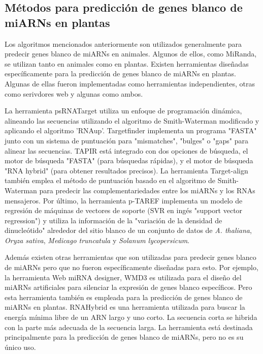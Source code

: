 \subsection{Métodos para predicción de genes blanco de miARNs en plantas}
Los algoritmos mencionados anteriormente son utilizados generalmente para predecir genes blanco de miARNs en animales.
Algunos de ellos, como MiRanda, se utilizan tanto en animales como en plantas.
Existen herramientas diseñadas específicamente para la predicción de genes blanco de miARNs en plantas.
Algunas de ellas fueron implementadas como herramientas independientes, otras como serivdores web y algunas como ambos.

La herramienta psRNATarget \citep{pmid21622958} utiliza un enfoque de programación dinámica, alineando las secuencias utilizando el algoritmo de Smith-Waterman modificado y aplicando el algoritmo 'RNAup'.
Targetfinder \citep{pmid15598838} implementa un programa "FASTA" junto con un sistema de puntuación para "mismatches", "bulges" o "gaps" para alinear las secuencias.
TAPIR \citep{pmid20430753} está integrado con dos opciones de búsqueda, el motor de búsqueda "FASTA" (para búsquedas rápidas), y el motor de búsqueda "RNA hybrid" (para obtener resultados precisos).
La herramienta Target-align \citep{pmid20934992} también emplea el método de puntuación basado en el algoritmo de Smith-Waterman para predecir las complementariedades entre los miARNs y los RNAs mensajeros.
Por último, la herramienta p-TAREF \citep{pmid22206472} implementa un modelo de regresión de máquinas de vectores de soporte (SVR en ingés "support vector regression") y utiliza la información de la "variación de la densidad de dinucleótido" alrededor del sitio blanco de un conjunto de datos de \textit{A. thaliana}, \textit{Oryza sativa}, \textit{Medicago truncatula} y \textit{Solanum lycopersicum}.

Además existen otras herramientas que son utilizadas para predecir genes blanco de miARNs pero que no fueron específicamente diseñadas para esto.
Por ejemplo, la herramienta  Web miRNA designer, WMD3 \citep{pmid18269576} es utilizada para el diseño del miARNs artificiales para silenciar la expresión de genes blanco específicos.
Pero esta herramienta también es empleada para la predicción de genes blanco de miARNs en plantas.
RNAHybrid \citep{Kruger01072006} es una herramienta utilizada para buscar la energía mínima libre de un ARN largo y uno corto.
La secuencia corta se hibrida con la parte más adecuada de la secuencia larga.
La herramienta está destinada principalmente para la predicción de genes blanco de miARNs, pero no es su único uso.

